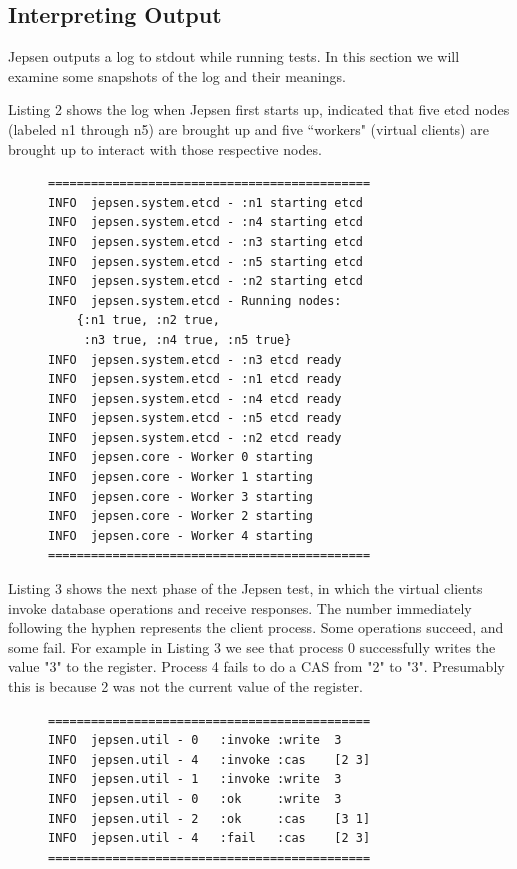 \documentclass[12pt,conference]{IEEEtran}
\begin{document}
\subsection{Interpreting Output}

Jepsen outputs a log to stdout while running tests. In this section we will examine some snapshots of the log and their meanings.

Listing 2 shows the log when Jepsen first starts up, indicated that five etcd nodes (labeled n1 through n5) are brought up and five ``workers" (virtual clients) are brought up to interact with those respective nodes.

\begin{figure}[!t]
    \scriptsize
\begin{lstlisting}[caption={Jepsen start sequence},label={jepsenStartSequence}]
=============================================
INFO  jepsen.system.etcd - :n1 starting etcd
INFO  jepsen.system.etcd - :n4 starting etcd
INFO  jepsen.system.etcd - :n3 starting etcd
INFO  jepsen.system.etcd - :n5 starting etcd
INFO  jepsen.system.etcd - :n2 starting etcd
INFO  jepsen.system.etcd - Running nodes: 
	{:n1 true, :n2 true,
	 :n3 true, :n4 true, :n5 true}
INFO  jepsen.system.etcd - :n3 etcd ready
INFO  jepsen.system.etcd - :n1 etcd ready
INFO  jepsen.system.etcd - :n4 etcd ready
INFO  jepsen.system.etcd - :n5 etcd ready
INFO  jepsen.system.etcd - :n2 etcd ready
INFO  jepsen.core - Worker 0 starting
INFO  jepsen.core - Worker 1 starting
INFO  jepsen.core - Worker 3 starting
INFO  jepsen.core - Worker 2 starting
INFO  jepsen.core - Worker 4 starting
=============================================
\end{lstlisting}
\end{figure}

Listing 3 shows the next phase of the Jepsen test, in which the virtual clients invoke database operations and receive responses. The number immediately following the hyphen represents the client process. Some operations succeed, and some fail. For example in Listing 3 we see that process 0 successfully writes the value "3" to the register. Process 4 fails to do a CAS from "2" to "3". Presumably this is because 2 was not the current value of the register.

\begin{figure}[!t]
    \scriptsize
\begin{lstlisting}[caption={Jepsen Database Operations},label={jepsenTestingPhase}]
=============================================
INFO  jepsen.util - 0   :invoke :write  3
INFO  jepsen.util - 4   :invoke :cas    [2 3]
INFO  jepsen.util - 1   :invoke :write  3
INFO  jepsen.util - 0   :ok     :write  3
INFO  jepsen.util - 2   :ok     :cas    [3 1]
INFO  jepsen.util - 4   :fail   :cas    [2 3]
=============================================
\end{lstlisting}
\end{figure}
\end{document}
